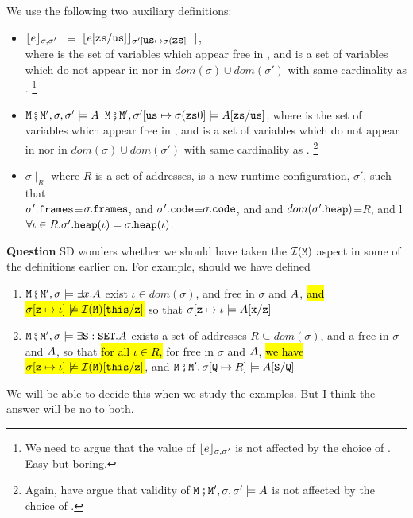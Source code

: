 \begin{definition}
\begin{itemize}
\end{itemize}
We use the following two auxiliary definitions:
\begin{itemize}
\item
${\lfloor{ {e}}\rfloor_{\sigma,\sigma'}}$ \ =\  $\interp{e[\prg{zs}/\prg{us}]}{\sigma'[\prg{us}\mapsto\sigma(\prg{zs}]}\ \ ]$,\\
 where    is the set of variables which appear free in , and     is a set of variables 
 which do not appear in  nor in $dom(\sigma)\cup dom(\sigma')$ with same cardinality as .
 \footnote{We need to argue that the value of ${\lfloor{ {e}}\rfloor_{\sigma,\sigma'}}$ is not affected by the choice of
. Easy but boring.}
\item
${\mbox{\tt{M}}}\fatsemi {\mbox{\tt{M}}}',\sigma,\sigma' \models A $ \IFF ${\mbox{\tt{M}}}\fatsemi {\mbox{\tt{M}}}',\sigma'[{\mbox{\tt{us}}}\mapsto\sigma({\mbox{\tt{zs}}}0] \models A[{\mbox{\tt{zs}}}/{\mbox{\tt{us}}}]$,
 where    is the set of variables which appear free in \A, and     is a set of variables 
 which do not appear in  nor in $dom(\sigma)\cup dom(\sigma')$ with same cardinality as .
 \footnote{Again, have argue that validity of ${\mbox{\tt{M}}}\fatsemi {\mbox{\tt{M}}}',\sigma,\sigma' \models A $ is not affected by the choice of
. }
\item
$\sigma\mid_R$ where $R$ is a set of addresses, is a new runtime configuration, $\sigma'$, such that\\
$\sigma'.{\mbox{\tt{frames}}}$=$\sigma.{\mbox{\tt{frames}}}$, 
and 
$\sigma'.{\mbox{\tt{code}}}$=$\sigma.{\mbox{\tt{code}}}$, and
and
$dom(\sigma'.{\mbox{\tt{heap}}})$=$R$, and  l $\forall \iota\in R.\sigma'.{\mbox{\tt{heap}}}(\iota)=\sigma.{\mbox{\tt{heap}}}(\iota)$.
\end{itemize}
\end{definition} 

\noindent
{\bf Question} SD wonders whether we should have taken the ${\mathcal I}({\mbox{\tt{M}}})$ aspect in some of
the definitions  earlier on. 
For example, should we have defined
\begin{enumerate}
\item 
${\mbox{\tt{M}}}\fatsemi {\mbox{\tt{M}}}', \sigma \models \exists x.A$ \IFF  exist  $\iota\in dom(\sigma)$, and    free in $\sigma$ and $A$, \hl{and $\sigma[{\mbox{\tt{z}}}\mapsto \iota] \not\models {\mathcal I}({\mbox{\tt{M}}})[{\mbox{\tt{this}}}/{\mbox{\tt{z}}}]$}  so that
$\sigma[{\mbox{\tt{z}}}\mapsto \iota \models  A[{\mbox{\tt{x}}}/{\mbox{\tt{z}}}]$ 
\item
${\mbox{\tt{M}}}\fatsemi {\mbox{\tt{M}}}', \sigma \models \exists {\mbox{\tt{S}}}:{\mbox{\tt{SET}}}.A$ \IFF 
 exists a set of addresses $R\subseteq dom(\sigma)$, and a  free in $\sigma$ and $A$, so that
\hl{for all $\iota\in R$,} for     free in $\sigma$ and $A$, \hl{we have }
  \hl{$\sigma[{\mbox{\tt{z}}}\mapsto \iota] \not\models {\mathcal I}({\mbox{\tt{M}}})[{\mbox{\tt{this}}}/{\mbox{\tt{z}}}]$}, and
${\mbox{\tt{M}}}\fatsemi {\mbox{\tt{M}}}', \sigma[{\mbox{\tt{Q}}}\mapsto R ]\models   A[{\mbox{\tt{S}}}/{\mbox{\tt{Q}}}]$ 
\end{enumerate}
We will be able to decide this when we study the examples. But I think the answer will be no to both.

